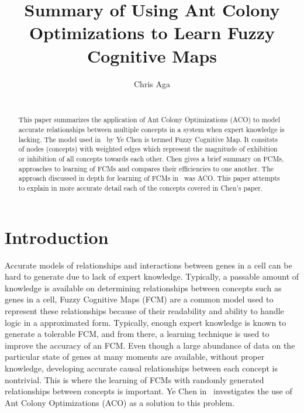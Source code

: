 \documentclass{umm-senior-sem}
\begin{document}
\title{Summary of Using Ant Colony Optimizations to Learn Fuzzy Cognitive Maps}
\author{
\alignauthor
Chris Aga \\
 \\
}

\maketitle

\begin{abstract}
This paper summarizes the application of Ant Colony Optimizations (ACO) to model accurate relationships between multiple concepts in a system when expert knowledge is lacking. The model used in~\cite{main:2012} by Ye Chen is termed Fuzzy Cognitive Map. It consitsts of nodes (concepts) with weighted edges which represent the magnitude of exhibition or inhibition of all concepts towards each other. Chen gives a brief summary on FCMs, approaches to learning of FCMs and compares their efficiencies to one another. The approach discussed in depth for learning of FCMs in~\cite{main:2012} was ACO. This paper attempts to explain in more accurate detail each of the concepts covered in Chen's paper.
\end{abstract}


\section{Introduction}
\label{sec:intro}
Accurate models of relationships and interactions between genes in a cell can be hard to generate due to lack of expert knowledge. Typically, a passable amount of knowledge is available on determining relationships between concepts such as genes in a cell, Fuzzy Cognitive Maps (FCM) are a common model used to represent these relationships because of their readability and ability to handle logic in a approximated form. Typically, enough expert knowledge is known to generate a tolerable FCM, and from there, a learning technique is used to improve the accuracy of an FCM. Even though a large abundance of data on the particular state of genes at many moments are available, without proper knowledge, developing accurate causal relationships between each concept is nontrivial. This is where the learning of FCMs with randomly generated relationships between concepts is important. Ye Chen in~\cite{main:2012} investigates the use of Ant Colony Optimizations (ACO) as a solution to this problem. 
\end{document}
